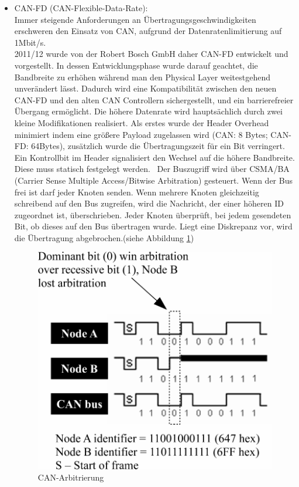     \begin{itemize}
        \item{CAN-FD (CAN-Flexible-Data-Rate):}\\
        Immer steigende Anforderungen an Übertragungsgeschwindigkeiten erschweren den Einsatz von 
        CAN, aufgrund der Datenratenlimitierung auf 1Mbit/s.\\ 2011/12 wurde von der Robert Bosch GmbH 
        daher CAN-FD entwickelt und vorgestellt. In dessen
        Entwicklungsphase wurde darauf geachtet, die Bandbreite zu erhöhen während man den Physical 
        Layer weitestgehend unverändert lässt. Dadurch wird eine Kompatibilität zwischen den neuen 
        CAN-FD und den alten CAN Controllern sichergestellt, 
        und ein barrierefreier Übergang ermöglicht.
        Die höhere Datenrate wird hauptsächlich durch zwei kleine Modifikationen realisiert. 
        Als erstes wurde der Header Overhead minimiert indem eine größere Payload zugelassen 
        wird (CAN: 8 Bytes; CAN-FD: 64Bytes), zusätzlich wurde die Übertragungszeit für ein Bit 
        verringert.~\cite{LA_CAN_FD1}\\
        Ein Kontrollbit im Header signalisiert den Wechsel auf die höhere Bandbreite. Diese muss statisch 
        festgelegt werden.~\cite{LA_CAN_FD2}
        Der Buszugriff wird über CSMA/BA (Carrier Sense Multiple Access/Bitwise Arbitration) gesteuert.
        Wenn der Bus frei ist darf jeder Knoten senden. Wenn mehrere Knoten gleichzeitig schreibend auf 
        den Bus zugreifen, wird die Nachricht, der einer höheren ID zugeordnet ist, überschrieben. Jeder
        Knoten überprüft, bei jedem gesendeten Bit, ob dieses auf den Bus übertragen wurde. Liegt eine 
        Diskrepanz vor, wird die Übertragung abgebrochen.(siehe Abbildung \ref{fig:AL01})~\cite{LA_FR1}\cite{LA_CAN3}

        \begin{figure}
            \centering
            \includegraphics[width=0.5\linewidth]{./images/Kapitel4/CAN_Arbitration.png}
            \caption[
                An analysis of CAN-based steer-by-wire system performance in vehicle \cite{LA_CAN3}]{CAN-Arbitrierung}
            \label{fig:AL01}
        \end{figure}
    \end{itemize}
   
